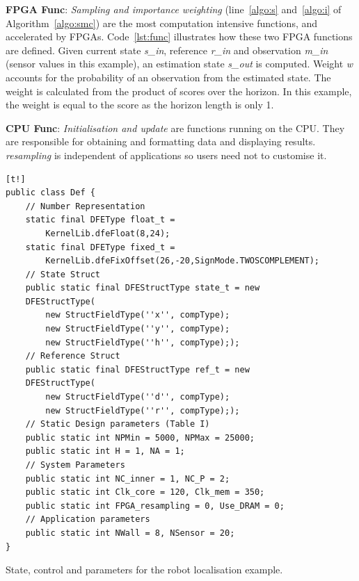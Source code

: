 \textbf{FPGA Func}: \textit{Sampling and importance weighting} (line~\ref{algo:s} and~\ref{algo:i} of Algorithm~\ref{algo:smc}) are the most computation intensive functions, and accelerated by FPGAs.
Code~\ref{lst:func} illustrates how these two FPGA functions are defined.
Given current state \textit{s\_in}, reference \textit{r\_in} and observation \textit{m\_in} (sensor values in this example), an estimation state \textit{s\_out} is computed.
Weight \textit{w} accounts for the probability of an observation from the estimated state.
The weight is calculated from the product of scores over the horizon.
In this example, the weight is equal to the score as the horizon length is only 1. 

\textbf{CPU Func}: \textit{Initialisation and update} are functions running on the CPU.
They are responsible for obtaining and formatting data and displaying results.
\textit{resampling} is independent of applications so users need not to customise it.

\begin{Code}
    \centering
\lstset{language=Java,
        basicstyle=\ttfamily\small,
				tabsize=2,
				numbers=left,
				numberstyle=\tiny,
				frame=tb,
				columns=fullflexible,
				showstringspaces=false
				}
\begin{lstlisting}[][t!]
public class Def {
	// Number Representation
	static final DFEType float_t = 
		KernelLib.dfeFloat(8,24);
	static final DFEType fixed_t = 
		KernelLib.dfeFixOffset(26,-20,SignMode.TWOSCOMPLEMENT);
	// State Struct
	public static final DFEStructType state_t = new 
	DFEStructType(
		new StructFieldType(''x'', compType);
		new StructFieldType(''y'', compType);
		new StructFieldType(''h'', compType););
	// Reference Struct
	public static final DFEStructType ref_t = new 
	DFEStructType(
		new StructFieldType(''d'', compType);
		new StructFieldType(''r'', compType););
	// Static Design parameters (Table I)
	public static int NPMin = 5000, NPMax = 25000;
	public static int H = 1, NA = 1;
	// System Parameters
	public static int NC_inner = 1, NC_P = 2;
	public static int Clk_core = 120, Clk_mem = 350;
	public static int FPGA_resampling = 0, Use_DRAM = 0;
	// Application parameters
	public static int NWall = 8, NSensor = 20;
}
\end{lstlisting}
\caption{\small State, control and parameters for the robot localisation example.}
\label{lst:def}
\end{Code}

